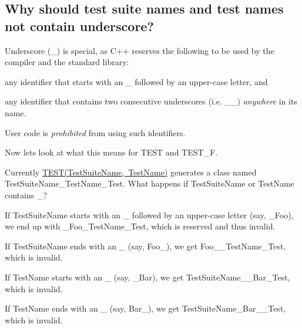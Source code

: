 \subsection*{Why should test suite names and test names not contain underscore?}

Underscore ({\ttfamily \+\_\+}) is special, as C++ reserves the following to be used by the compiler and the standard library\+:


\begin{DoxyEnumerate}
\item any identifier that starts with an {\ttfamily \+\_\+} followed by an upper-\/case letter, and
\end{DoxyEnumerate}
\begin{DoxyEnumerate}
\item any identifier that contains two consecutive underscores (i.\+e. {\ttfamily \+\_\+\+\_\+}) {\itshape anywhere} in its name.
\end{DoxyEnumerate}

User code is {\itshape prohibited} from using such identifiers.

Now let\textquotesingle{}s look at what this means for {\ttfamily T\+E\+ST} and {\ttfamily T\+E\+S\+T\+\_\+F}.

Currently {\ttfamily \mbox{\hyperlink{_obj__test_2lib_2googletest-release-1_88_81_2googletest_2include_2gtest_2gtest_8h_ad8b332753515c0ab8baada563c2547eb}{T\+E\+S\+T(\+Test\+Suite\+Name, Test\+Name)}}} generates a class named {\ttfamily Test\+Suite\+Name\+\_\+\+Test\+Name\+\_\+\+Test}. What happens if {\ttfamily Test\+Suite\+Name} or {\ttfamily Test\+Name} contains {\ttfamily \+\_\+}?


\begin{DoxyEnumerate}
\item If {\ttfamily Test\+Suite\+Name} starts with an {\ttfamily \+\_\+} followed by an upper-\/case letter (say, {\ttfamily \+\_\+\+Foo}), we end up with {\ttfamily \+\_\+\+Foo\+\_\+\+Test\+Name\+\_\+\+Test}, which is reserved and thus invalid.
\end{DoxyEnumerate}
\begin{DoxyEnumerate}
\item If {\ttfamily Test\+Suite\+Name} ends with an {\ttfamily \+\_\+} (say, {\ttfamily Foo\+\_\+}), we get {\ttfamily Foo\+\_\+\+\_\+\+Test\+Name\+\_\+\+Test}, which is invalid.
\end{DoxyEnumerate}
\begin{DoxyEnumerate}
\item If {\ttfamily Test\+Name} starts with an {\ttfamily \+\_\+} (say, {\ttfamily \+\_\+\+Bar}), we get {\ttfamily Test\+Suite\+Name\+\_\+\+\_\+\+Bar\+\_\+\+Test}, which is invalid.
\end{DoxyEnumerate}
\begin{DoxyEnumerate}
\item If {\ttfamily Test\+Name} ends with an {\ttfamily \+\_\+} (say, {\ttfamily Bar\+\_\+}), we get {\ttfamily Test\+Suite\+Name\+\_\+\+Bar\+\_\+\+\_\+\+Test}, which is invalid.
\end{DoxyEnumerate}

